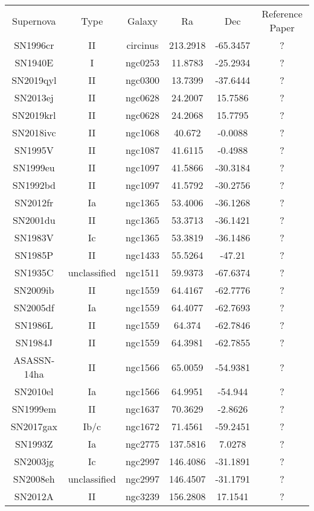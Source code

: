 \begin{table}
\begin{tabular}{cccccc}
Supernova & Type & Galaxy & Ra & Dec & Reference Paper \\
SN1996cr & II & circinus & 213.2918 & -65.3457 & ? \\
SN1940E & I & ngc0253 & 11.8783 & -25.2934 & ? \\
SN2019qyl & II & ngc0300 & 13.7399 & -37.6444 & ? \\
SN2013ej & II & ngc0628 & 24.2007 & 15.7586 & ? \\
SN2019krl & II & ngc0628 & 24.2068 & 15.7795 & ? \\
SN2018ivc & II & ngc1068 & 40.672 & -0.0088 & ? \\
SN1995V & II & ngc1087 & 41.6115 & -0.4988 & ? \\
SN1999eu & II & ngc1097 & 41.5866 & -30.3184 & ? \\
SN1992bd & II & ngc1097 & 41.5792 & -30.2756 & ? \\
SN2012fr & Ia & ngc1365 & 53.4006 & -36.1268 & ? \\
SN2001du & II & ngc1365 & 53.3713 & -36.1421 & ? \\
SN1983V & Ic & ngc1365 & 53.3819 & -36.1486 & ? \\
SN1985P & II & ngc1433 & 55.5264 & -47.21 & ? \\
SN1935C & unclassified & ngc1511 & 59.9373 & -67.6374 & ? \\
SN2009ib & II & ngc1559 & 64.4167 & -62.7776 & ? \\
SN2005df & Ia & ngc1559 & 64.4077 & -62.7693 & ? \\
SN1986L & II & ngc1559 & 64.374 & -62.7846 & ? \\
SN1984J & II & ngc1559 & 64.3981 & -62.7855 & ? \\
ASASSN-14ha & II & ngc1566 & 65.0059 & -54.9381 & ? \\
SN2010el & Ia & ngc1566 & 64.9951 & -54.944 & ? \\
SN1999em & II & ngc1637 & 70.3629 & -2.8626 & ? \\
SN2017gax & Ib/c & ngc1672 & 71.4561 & -59.2451 & ? \\
SN1993Z & Ia & ngc2775 & 137.5816 & 7.0278 & ? \\
SN2003jg & Ic & ngc2997 & 146.4086 & -31.1891 & ? \\
SN2008eh & unclassified & ngc2997 & 146.4507 & -31.1791 & ? \\
SN2012A & II & ngc3239 & 156.2808 & 17.1541 & ? \\

\end{tabular}
\end{table}
